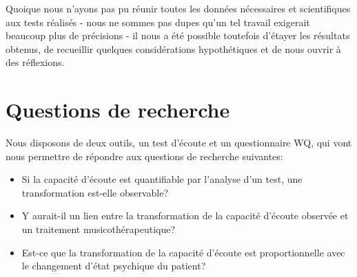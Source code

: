 


Quoique nous n'ayons  pas pu réunir toutes les données nécessaires et scientifiques
aux tests réalisés - nous ne sommes pas dupes qu'un tel travail
exigerait beaucoup plus de précisions - il nous a été possible toutefois d'étayer
les résultats obtenus, de recueillir quelques considérations hypothétiques et de nous ouvrir à des réflexions.







\section* {Questions de recherche}


Nous disposons de deux outils, un test d'écoute et un questionnaire WQ, qui vont nous permettre de 
répondre aux questions de recherche suivantes: 

\begin{itemize}
        \item Si la capacité d'écoute est quantifiable par
                 l'analyse d'un test,
          une transformation est-elle observable?
        \item Y aurait-il un lien entre la transformation de la capacité d'écoute observée  et un traitement 
        musicothérapeutique?
  \item Est-ce que la transformation de la capacité d'écoute est proportionnelle avec le changement 
  d'état psychique du patient?
   \end{itemize}



